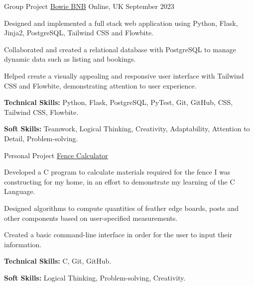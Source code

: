 

\begin{cventries}

  \cventry
    {Group Project} %
    {\href{https://github.com/NDR-114/bowie-bnb-project}{Bowie BNB}} %
    {Online, UK} %
    {September 2023} %
    {
      \begin{cvitems} %
        \item {Designed and implemented a full stack web application using Python, Flask, Jinja2, PostgreSQL, Tailwind CSS and Flowbite.}
        \item {Collaborated and created a relational database with PostgreSQL to manage dynamic data such as listing and bookings.}
        \item {Helped create a visually appealing and responsive user interface with Tailwind CSS and Flowbite, demonstrating attention to user experience.}
        \item {\textbf{Technical Skills:} Python, Flask, PostgreSQL, PyTest, Git, GitHub, CSS, Tailwind CSS, Flowbite.}
        \item {\textbf{Soft Skills:} Teamwork, Logical Thinking, Creativity, Adaptability, Attention to Detail, Problem-solving.}
      \end{cvitems}
    }


  \cventry %
    {Personal Project}
    {\href{https://github.com/NDR-114/fence_calculator}{Fence Calculator}}%
    {} %
    {} %
    {
      \begin{cvitems} %
        \item {Developed a C program to calculate materials required for the fence I was constructing for my home, in an effort to demonstrate my learning of the C Language.}
        \item {Designed algorithms to compute quantities of feather edge boards, posts and other components based on user-specified measurements.}
        \item {Created a basic command-line interface in order for the user to input their information.}
        \item {\textbf{Technical Skills:} C, Git, GitHub.}
        \item {\textbf{Soft Skills:} Logical Thinking, Problem-solving, Creativity.}
      \end{cvitems}
    }


\end{cventries}
